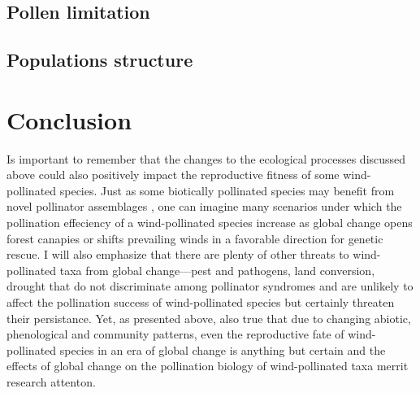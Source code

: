 \documentclass[11pt]{article}
\begin{document}
\subsection*{Pollen limitation}
\subsection*{Populations structure}

\section*{Conclusion}
Is important to remember that the changes to the ecological processes discussed above could also positively impact the reproductive fitness of some wind-pollinated species. Just as some biotically pollinated species may benefit from novel pollinator assemblages \citep{}, one can imagine many scenarios under which the pollination effeciency of a wind-pollinated species increase as global change opens forest canapies or shifts prevailing winds in a favorable direction for genetic rescue. I will also emphasize that there are plenty of other threats to wind-pollinated taxa from global change---pest and pathogens, land conversion, drought that do not discriminate among pollinator syndromes and are unlikely to affect the pollination success of wind-pollinated species but certainly threaten their persistance. Yet, as presented above, also true that due to changing abiotic, phenological and community patterns, even the reproductive fate of wind-pollinated species in an era of global change is anything but certain and the effects of global change on the pollination biology of wind-pollinated taxa merrit research attenton.\\


\subsection*{}
\end{document}
